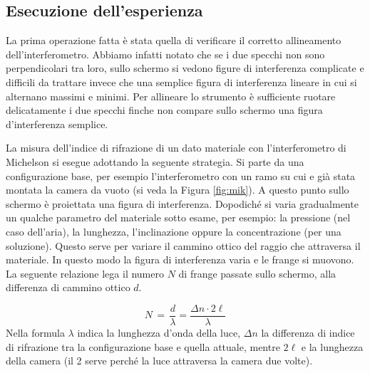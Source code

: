 \subsection{Esecuzione dell'esperienza}

La prima operazione fatta è stata quella di verificare il corretto allineamento dell'interferometro. Abbiamo infatti notato che se i due specchi non sono perpendicolari tra loro, sullo schermo si vedono figure di interferenza complicate e difficili da trattare invece che una semplice figura di interferenza lineare in cui si alternano massimi e minimi. Per allineare lo strumento è sufficiente ruotare delicatamente i due specchi finche non compare sullo schermo una figura d'interferenza semplice.


La misura dell'indice di rifrazione di un dato materiale con l'interferometro di Michelson si esegue adottando la seguente strategia.
Si parte da una configurazione base, per esempio l'interferometro con un ramo su cui e già stata montata la camera da vuoto
(si veda la Figura \ref{fig:mik}). A questo punto sullo schermo è proiettata una figura di interferenza. Dopodiché si
varia gradualmente un qualche parametro del materiale sotto esame, per esempio: la pressione (nel caso dell'aria), la lunghezza,
l'inclinazione oppure la concentrazione (per una soluzione). Questo serve per variare il cammino ottico del raggio che attraversa il materiale.
In questo modo la figura di interferenza varia e le frange si muovono. La seguente relazione lega il numero $N$ di frange passate sullo schermo,
alla differenza di cammino ottico $d$.

\begin{equation}
    N \,=\, \frac{d}{\lambda} = \frac{\Delta n \cdot 2 \ell}{\lambda}
\end{equation}
%
Nella formula $\lambda$ indica la lunghezza d'onda della luce, $\Delta n$ la differenza di indice di rifrazione tra la configurazione base
e quella attuale, mentre $2\ell$ e la lunghezza della camera (il 2 serve perché la luce attraversa la camera due volte).

